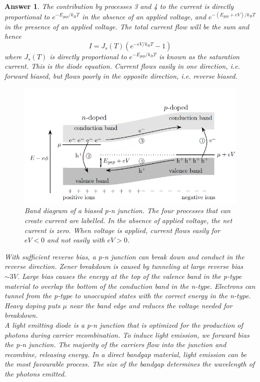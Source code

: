 \documentclass[a4paper]{article}
\newtheorem{ans}{Answer}[section]
\theoremstyle{new}
\begin{document}
\begin{ans}
The contribution by processes 3 and 4 to the current is directly proportional to $e^{-E_{gap}/k_BT}$ in the absence of an applied voltage, and $e^{-(E_{gap}+eV)/k_BT}$ in the presence of an applied voltage. The total current flow will be the sum and hence
$$I=J_s(T)(e^{-eV/k_BT}-1)$$
where $J_s(T)$ is directly proportional to $e^{-E_{gap}/k_BT}$ is known as the saturation current. This is the diode equation. Current flows easily in one direction, i.e. forward biased, but flows poorly in the opposite direction, i.e. reverse biased.
\begin{figure}[H]
    \centering
    \includegraphics[width=\linewidth]{biasedPN.PNG}
    \caption{Band diagram of a biased p-n junction. The four processes that can create current are labelled. In the absence of applied voltage, the net current is zero. When voltage is applied, current flows easily for $eV<0$ and not easily with $eV>0$. }
\end{figure}
With sufficient reverse bias, a p-n junction can break down and conduct in the reverse direction. Zener breakdown is caused by tunneling at large reverse bias $\sim3V$. Large bias causes the energy at the top of the valence band in the p-type material to overlap the bottom of the conduction band in the n-type. Electrons can tunnel from the p-type to unoccupied states with the correct energy in the n-type. Heavy doping puts $\mu$ near the band edge and reduces the voltage needed for breakdown.\\[5pt]
A light emitting diode is a p-n junction that is optimized for the production of photons during carrier recombination. To induce light emission, we forward bias the p-n junction. The majority of the carriers flow into the junction and recombine, releasing energy. In a direct bandgap material, light emission can be the most favourable process. The size of the bandgap determines the wavelength of the photons emitted.\\[5pt]

\end{ans}
\end{document}
